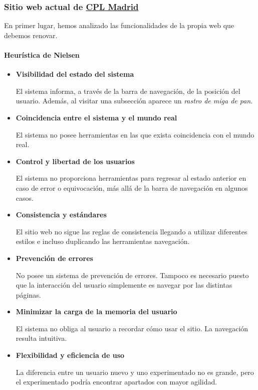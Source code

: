 \documentclass[10pt, spanish, pdftex]{template/UC3M_document}
\begin{document}
\subsubsection{Sitio web actual de \href{http://www.cplmadrid.com/}{CPL Madrid}}
En primer lugar, hemos analizado las funcionalidades de la propia web que debemos renovar.
\paragraph{Heurística de Nielsen}
\begin{itemize}
  \item \textbf{Visibilidad del estado del sistema}

  El sistema informa, a través de la barra de navegación, de la posición del usuario. Además, al visitar una subsección aparece un \textit{rastro de miga de pan}.

  \item \textbf{Coincidencia entre el sistema y el mundo real}

  El sistema no posee herramientas en las que exista coincidencia con el mundo real.

  \item \textbf{Control y libertad de los usuarios}

  El sistema no proporciona herramientas para regresar al estado anterior en caso de error o equivocación, más allá de la barra de navegación en algunos casos.

  \item \textbf{Consistencia y estándares}

  El sitio web no sigue las reglas de consistencia llegando a utilizar diferentes estilos e incluso duplicando las herramientas navegación.

  \item \textbf{Prevención de errores}

  No posee un sistema de prevención de errores. Tampoco es necesario puesto que la interacción del usuario simplemente es navegar por las distintas páginas.

  \item \textbf{Minimizar la carga de la memoria del usuario}

  El sistema no obliga al usuario a recordar cómo usar el sitio. La navegación resulta intuitiva.

  \item \textbf{Flexibilidad y eficiencia de uso}

  La diferencia entre un usuario nuevo y uno experimentado no es grande, pero el experimentado podría encontrar apartados con mayor agilidad.


\end{itemize}
\end{document}
